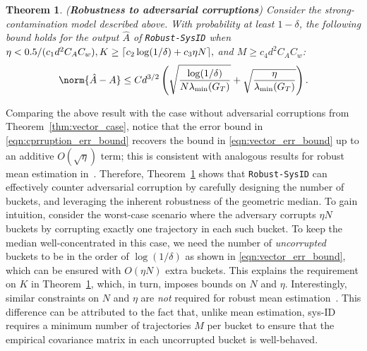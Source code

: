 \documentclass[letterpaper, 11 pt]{article}
\DeclarePairedDelimiter\ceil{\lceil}{\rceil}
\newtheorem{theorem}{Theorem}
\begin{document}
\begin{theorem} \label{thm:corruption} (\textbf{Robustness to adversarial corruptions}) Consider the strong-contamination model described above. With probability at least $1-\delta$, the following bound holds for the output $\hat{A}$ of \texttt{Robust-SysID} when $\eta < 0.5/(c_1d^2C_AC_w), K \geq \ceil{c_2 \log(1/\delta) + c_3 \eta N},$ and $ M \geq c_4 d^2C_AC_w$: 
\begin{equation}
    \norm{\hat{A} - A} \leq C d^{3/2}\left(\sqrt{\frac{\log(1/\delta)}{N \lambda_{\min}(G_T)}} + \sqrt{\frac{\eta}{ \lambda_{\min}(G_T)}}\right).
    \label{eqn:cprruption_err_bound}
\end{equation}
\end{theorem}
Comparing the above result with the case without adversarial corruptions from Theorem~\ref{thm:vector_case}, notice that the error bound in \eqref{eqn:cprruption_err_bound} recovers the bound in \eqref{eqn:vector_err_bound} up to an additive $O(\sqrt{\eta})$ term; this is consistent with analogous results for robust mean estimation in~\cite{lugosi2021robust}. Therefore, Theorem~\ref{thm:corruption} shows that \texttt{Robust-SysID} can effectively counter adversarial corruption by carefully designing the number of buckets, and leveraging the inherent robustness of the geometric median. To gain intuition, consider the worst-case scenario where the adversary corrupts $\eta N$ buckets by corrupting exactly one trajectory in each such bucket. To keep the median well-concentrated in this case, we need the number of \emph{uncorrupted} buckets to be in the order of $\log(1/\delta)$ as shown in \eqref{eqn:vector_err_bound}, which can be ensured with $O(\eta N)$ extra buckets. This explains the requirement on $K$ in Theorem~\ref{thm:corruption}, which, in turn, imposes bounds on $N$ and $\eta$. 
Interestingly, similar constraints on $N$ and $\eta$ are \emph{not} required for robust mean estimation~\cite{lugosi2021robust}. This difference can be attributed to the fact that, unlike mean estimation, sys-ID requires a minimum number of trajectories $M$ per bucket to ensure that the empirical covariance matrix in each uncorrupted bucket is well-behaved. 
\end{document}
